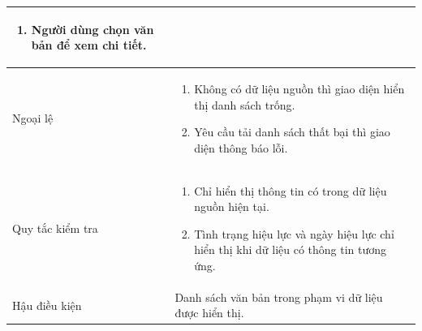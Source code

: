 \documentclass[12pt,a4paper,oneside]{report}
\begin{document}
{\begin{longtable}{|L{3.6cm}|L{11.2cm}|}
\begin{enumerate}[leftmargin=*,nosep]
                            \item Người dùng chọn văn bản để xem chi tiết.
                          \end{enumerate}                               \\
    \hline
    Ngoại lệ            & \begin{enumerate}[leftmargin=*,nosep]
                            \item Không có dữ liệu nguồn thì giao diện hiển thị danh sách trống.
                            \item Yêu cầu tải danh sách thất bại thì giao diện thông báo lỗi.
                          \end{enumerate}                           \\
    \hline
    Quy tắc kiểm tra    & \begin{enumerate}[leftmargin=*,nosep]
                            \item Chỉ hiển thị thông tin có trong dữ liệu nguồn hiện tại.
                            \item Tình trạng hiệu lực và ngày hiệu lực chỉ hiển thị khi dữ liệu có thông tin tương ứng.
                          \end{enumerate}    \\
    \hline
    Hậu điều kiện       & Danh sách văn bản trong phạm vi dữ liệu được hiển thị.                                        \\
    \hline
  \end{longtable}
}
\end{document}
